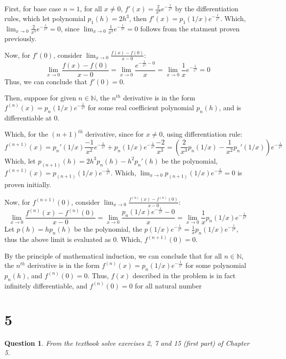 \documentclass{article}
\newtheorem{question}{Question}
\begin{document}
\hfill

First, for base case $n=1$, for all $x\neq 0$, $f'(x)=\frac{2}{x^3}e^{-\frac{1}{x^2}}$ by the differentiation rules, which let polynomial $p_1(h)=2h^3$, then $f'(x)=p_1(1/x)e^{-\frac{1}{x^2}}$. 
Which, $\lim_{x\rightarrow 0}\frac{2}{x^3}e^{-\frac{1}{x^2}}=0$, since $\lim_{x\rightarrow 0}\frac{1}{x^3}e^{-\frac{1}{x^2}}=0$ follows from the statment proven previously.

Now, for $f'(0)$, consider $\lim_{x\rightarrow 0}\frac{f(x)-f(0)}{x-0}$:
$$\lim_{x\rightarrow 0}\frac{f(x)-f(0)}{x-0}=\lim_{x\rightarrow 0}\frac{e^{-\frac{1}{x^2}-0}}{x} = \lim_{x\rightarrow 0}\frac{1}{x}e^{-\frac{1}{x^2}}=0$$
Thus, we can conclude that $f'(0)=0$.

\hfill

Then, suppose for given $n\in\mathbb{N}$, the $n^{th}$ derivative is in the form $f^{(n)}(x)=p_n(1/x)e^{-\frac{1}{x^2}}$ for some real coefficient polynomial $p_n(h)$, and is differentiable at $0$.

Which, for the $(n+1)^{th}$ derivative, since for $x\neq 0$, using differentiation rule:
$$f^{(n+1)}(x)=p_n'(1/x)\frac{-1}{x^2}e^{-\frac{1}{x^2}}+p_n(1/x)e^{-\frac{1}{x^2}}\frac{-2}{x^3} = (\frac{2}{x^3}p_n(1/x)-\frac{1}{x^2}p_n'(1/x))e^{-\frac{1}{x^2}}$$
Which, let $p_{(n+1)}(h)=2h^3p_n(h)-h^2p_n'(h)$ be the polynomial, $f^{(n+1)}(x)=p_{(n+1)}(1/x)e^{-\frac{1}{x^2}}$. Which, $\lim_{x\rightarrow 0}p_{(n+1)}(1/x)e^{-\frac{1}{x^2}}=0$ is proven initially.

Now, for $f^{(n+1)}(0)$, consider $\lim_{x\rightarrow 0}\frac{f^{(n)}(x)-f^{(n)}(0)}{x-0}$:
$$\lim_{x\rightarrow 0}\frac{f^{(n)}(x)-f^{(n)}(0)}{x-0} =\lim_{x\rightarrow 0}\frac{p_n(1/x)e^{-\frac{1}{x^2}}-0}{x} = \lim_{x\rightarrow 0}\frac{1}{x}p_n(1/x)e^{-\frac{1}{x^2}}$$
Let $p(h)=hp_n(h)$ be the polynomial, the $p(1/x)e^{-\frac{1}{x^2}}=\frac{1}{x}p_n(1/x)e^{-\frac{1}{x^2}}$, thus the above limit is evaluated as $0$.
Which, $f^{(n+1)}(0)=0$.

\hfill

By the principle of mathematical induction, we can conclude that for all $n\in\mathbb{N}$, the $n^{th}$ derivative is in the form $f^{(n)}(x)=p_n(1/x)e^{-\frac{1}{x^2}}$ for some polynomial $p_n(h)$, 
and $f^{(n)}(0)=0$. Thus, $f(x)$ described in the problem is in fact infinitely differentiable, and $f^{(n)}(0)=0$ for all natural number

\hfill

\hfill

\section*{5}
\begin{myBox}[]{}
    \begin{question}
        From the textbook solve exercises 2, 7 and 15 (first part) of Chapter 5.
    \end{question}
\end{myBox}
\end{document}
